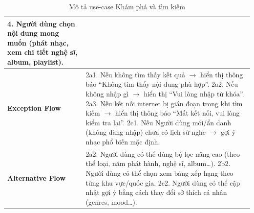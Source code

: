 \documentclass[a4paper]{article}
\begin{document}
\begin{table}[H]
\begin{tabularx}{\textwidth}{|l|X|}
		4. Người dùng chọn nội dung mong muốn (phát nhạc, xem chi tiết nghệ sĩ, album, playlist).                                                                                     \\ \hline
		\textbf{Exception Flow}
		                       & 2a1. Nếu không tìm thấy kết quả $\rightarrow$ hiển thị thông báo “Không tìm thấy nội dung phù hợp”. \newline
		2a2. Nếu không nhập gì $\rightarrow$ hiển thị “Vui lòng nhập từ khóa”. \newline
		2a3. Nếu kết nối internet bị gián đoạn trong khi tìm kiếm $\rightarrow$ hiển thị thông báo “Mất kết nối, vui lòng kiểm tra lại”. \newline
		2c1. Nếu Người dùng mới/ẩn danh (không đăng nhập) chưa có lịch sử nghe $\rightarrow$ gợi ý nhạc phổ biến mặc định.                                                            \\ \hline
		\textbf{Alternative Flow}
		                       & 2a2. Người dùng có thể dùng bộ lọc nâng cao (theo thể loại, năm phát hành, nghệ sĩ, album…). \newline
		2b2. Người dùng có thể chọn xem bảng xếp hạng theo từng khu vực/quốc gia. \newline
		2c2. Người dùng có thể cập nhật gợi ý bằng cách thay đổi sở thích cá nhân (genres, mood…).                                                                                    \\ \hline
	\end{tabularx}
	\caption{Mô tả use-case Khám phá và tìm kiếm}
\end{table}

\end{document}
